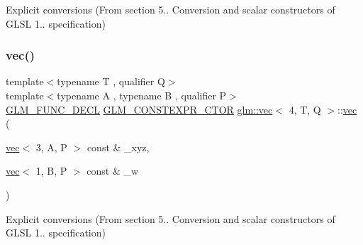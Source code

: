 Explicit conversions (From section 5.. Conversion and scalar constructors of G\+L\+SL 1.. specification) 

\mbox{\label{structglm_1_1vec_3_014_00_01_t_00_01_q_01_4_a978b89aabfd77a4d64bbd7d347e98ffe}} 
\subsubsection{\texorpdfstring{vec()}{vec()}\hspace{0.1cm}{\footnotesize\ttfamily [15/34]}}
{\footnotesize\ttfamily template$<$typename T , qualifier Q$>$ \\
template$<$typename A , typename B , qualifier P$>$ \\
\mbox{\hyperlink{setup_8hpp_ab2d052de21a70539923e9bcbf6e83a51}{G\+L\+M\+\_\+\+F\+U\+N\+C\+\_\+\+D\+E\+CL}} \mbox{\hyperlink{setup_8hpp_ad34178a09666081abdb573c14d1f4a5a}{G\+L\+M\+\_\+\+C\+O\+N\+S\+T\+E\+X\+P\+R\+\_\+\+C\+T\+OR}} \mbox{\hyperlink{structglm_1_1vec}{glm\+::vec}}$<$ 4, T, Q $>$\+::\mbox{\hyperlink{structglm_1_1vec}{vec}} (\begin{DoxyParamCaption}\item[{\mbox{\hyperlink{structglm_1_1vec}{vec}}$<$ 3, A, P $>$ const \&}]{\+\_\+xyz,  }\item[{\mbox{\hyperlink{structglm_1_1vec}{vec}}$<$ 1, B, P $>$ const \&}]{\+\_\+w }\end{DoxyParamCaption})}



Explicit conversions (From section 5.. Conversion and scalar constructors of G\+L\+SL 1.. specification) 

\mbox{\label{structglm_1_1vec_3_014_00_01_t_00_01_q_01_4_a91225fa0646f68aae775792183d3e0df}} 
